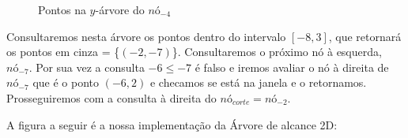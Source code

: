 \begin{figure}[h]
    \centering
{}
\caption{Pontos na $y$-árvore do $nó_{-4}$}
\end{figure}

Consultaremos nesta árvore os pontos dentro do intervalo $[-8, 3]$, que retornará os pontos em cinza = \{$(-2,-7)$\}.
Consultaremos o próximo nó à esquerda, $nó_{-7}$. Por sua vez a consulta $-6 \leq -7$ é falso e iremos avaliar o nó à direita de $nó_{-7}$ que é o ponto $(-6, 2)$ e checamos se está na janela e o retornamos.
Prosseguiremos com a consulta à direita do $nó_{corte}= nó_{-2}$.

A figura a seguir é a nossa implementação da Árvore de alcance 2D:

